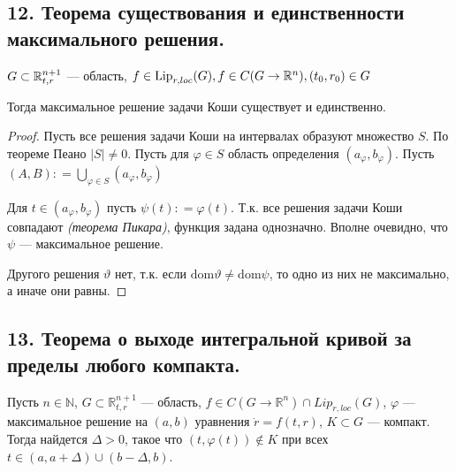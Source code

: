 \subsection*{12. Теорема существования и единственности максимального решения.}

\begin{theorem}
    \(G\subset \mathbb{R}^{n + 1}_{t, r}\) --- область, \(f\in \text{Lip}_{r, loc}(G), f\in C(G \to \mathbb{R}^n), (t_0, r_0)\in G\)

    Тогда максимальное решение задачи Коши существует и единственно.
\end{theorem}
\begin{proof}
    Пусть все решения задачи Коши на интервалах образуют множество \(S\). По теореме Пеано \(|S| \neq 0\). Пусть для \(\varphi\in S\) область определения \((a_\varphi, b_\varphi)\). Пусть \((A,B) : = \bigcup\limits_{\varphi\in S}(a_\varphi, b_\varphi)\)

    Для \(t\in(a_\varphi, b_\varphi)\) пусть \(\psi(t) : = \varphi(t)\). Т.к. все решения задачи Коши совпадают \textit{(теорема Пикара)}, функция задана однозначно. Вполне очевидно, что \(\psi\) --- максимальное решение.

    Другого решения \(\vartheta\) нет, т.к. если \(\text{dom} \vartheta \neq \text{dom} \psi\), то одно из них не максимально, а иначе они равны.
\end{proof}

\subsection*{13. Теорема о выходе интегральной кривой за пределы любого компакта.}

\begin{theorem}
    Пусть $n \in \mathbb{N}$, $G \subset \mathbb{R}_{t,r}^{n+1}$ --- область, $f \in C(G \to \mathbb{R}^n)\cap Lip_{r,loc}(G)$, $\varphi$ --- максимальное решение на $(a,b)$ уравнения $\dot{r} = f(t,r)$, $K \subset G$ --- компакт. Тогда найдется $\Delta > 0$, такое что $(t, \varphi(t)) \notin K$ при всех $t \in (a, a + \Delta) \cup (b - \Delta, b)$.
\end{theorem}

